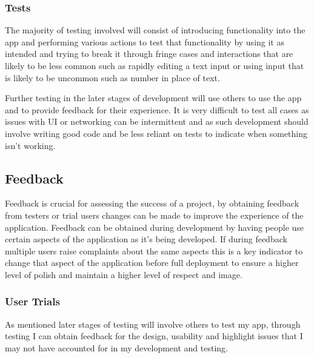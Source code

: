 \subsubsection{Tests}\label{tests}

The majority of testing involved will consist of introducing
functionality into the app and performing various actions to test that
functionality by using it as intended and trying to break it through
fringe cases and interactions that are likely to be less common such as
rapidly editing a text input or using input that is likely to be
uncommon such as number in place of text.

Further testing in the later stages of development will use others to
use the app and to provide feedback for their experience. It is very
difficult to test all cases as issues with UI or networking can be
intermittent and as such development should involve writing good code
and be less reliant on tests to indicate when something isn't working.

\subsection{Feedback}\label{feedback}

Feedback is crucial for assessing the success of a project, by obtaining
feedback from testers or trial users changes can be made to improve the
experience of the application. Feedback can be obtained during
development by having people use certain aspects of the application as
it's being developed. If during feedback multiple users raise complaints
about the same aspects this is a key indicator to change that aspect of
the application before full deployment to ensure a higher level of
polish and maintain a higher level of respect and image.

\subsubsection{User Trials}\label{user-trials}

As mentioned later stages of testing will involve others to test my app,
through testing I can obtain feedback for the design, usability and
highlight issues that I may not have accounted for in my development and
testing.
